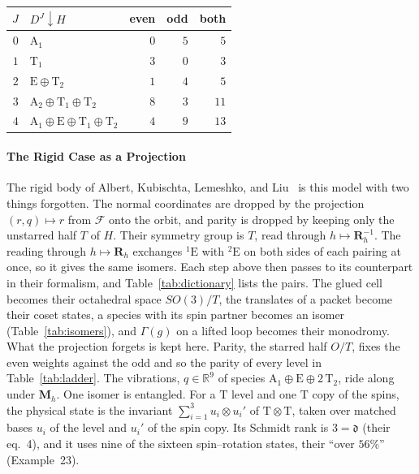 \documentclass[11pt]{article}
\newenvironment{plaintable}{\par\medskip\noindent\begin{minipage}{\linewidth}\captionsetup{type=table,skip=3pt}\small
  \renewcommand{\arraystretch}{1.05}\setlength{\tabcolsep}{5pt}}{\end{minipage}\par\medskip}
\newcommand{\R}{\mathbb{R}}
\newcommand{\Rmat}{\mathbf{R}}
\begin{document}
\begin{plaintable}
\caption{The $J$ ladder, with $D^J$ restricted to $H$ and the physical states of each $J$ by parity.}
\label{tab:ladder}
\centering
\begin{tabular}{@{}rlrrr@{}}
\hline
$J$ & $D^J\downarrow H$ & even & odd & both\\
\hline
$0$ & $\mathrm A_1$ & $0$ & $5$ & $5$\\
$1$ & $\mathrm T_1$ & $3$ & $0$ & $3$\\
$2$ & $\mathrm E\oplus\mathrm T_2$ & $1$ & $4$ & $5$\\
$3$ & $\mathrm A_2\oplus\mathrm T_1\oplus\mathrm T_2$ & $8$ & $3$ & $11$\\
$4$ & $\mathrm A_1\oplus\mathrm E\oplus\mathrm T_1\oplus\mathrm T_2$ & $4$ & $9$ & $13$\\
\hline
\end{tabular}
\end{plaintable}

\paragraph{The Rigid Case as a Projection}
The rigid body of Albert, Kubischta, Lemeshko, and
Liu~\cite{AlbertEtAlOrientation} is this model with two things forgotten. The normal coordinates are
dropped by the projection $(r,q)\mapsto r$ from $\mathcal F$ onto the orbit, and parity is dropped by
keeping only the unstarred half $T$ of $H$. Their symmetry group is $T$, read through
$h\mapsto\Rmat_h^{-1}$. The reading through $h\mapsto\Rmat_h$ exchanges ${}^1\mathrm E$ with
${}^2\mathrm E$ on both sides of each pairing at once, so it gives the same isomers. Each step above then
passes to its counterpart in their formalism, and Table~\ref{tab:dictionary} lists the pairs. The glued
cell becomes their
octahedral space $SO(3)/T$, the translates of a packet become their coset states, a species with its spin
partner becomes an isomer (Table~\ref{tab:isomers}), and $\Gamma(g)$ on a lifted loop becomes their
monodromy. What the
projection forgets is kept here. Parity, the starred half $O/T$, fixes the even weights against the odd
and so the parity of every level in Table~\ref{tab:ladder}. The vibrations, $q\in\R^9$ of species
$\mathrm A_1\oplus\mathrm E\oplus2\,\mathrm T_2$, ride along under $\mathbf M_h$. One isomer is entangled.
For a $\mathrm T$ level and one $\mathrm T$ copy of the spins, the physical state is the invariant
$\sum_{i=1}^3u_i\otimes u_i'$ of $\mathrm T\otimes\mathrm T$, taken over matched bases $u_i$ of the level
and $u_i'$ of
the spin copy. Its Schmidt rank is $3=\mathfrak d$ (their eq.~4), and it uses nine of the sixteen
spin--rotation states, their ``over $56\%$'' (Example~23).
\end{document}
